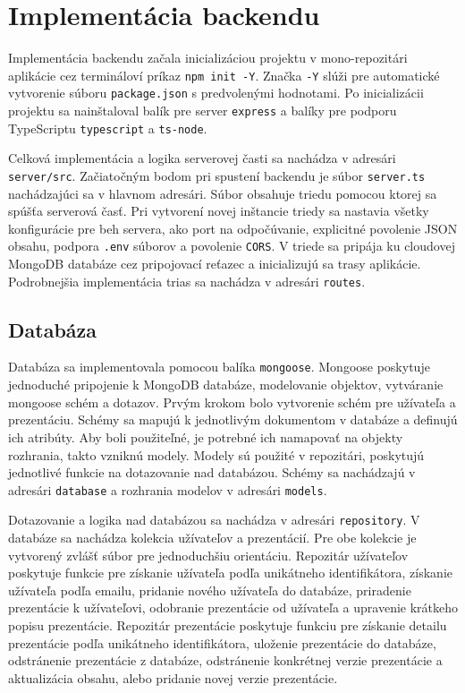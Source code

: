 \section{Implementácia backendu}
Implementácia backendu začala inicializáciou projektu v mono-repozitári aplikácie cez termináloví príkaz \texttt{npm init -Y}. Značka \texttt{-Y} slúži pre automatické vytvorenie súboru \texttt{package.json} s predvolenými hodnotami. Po inicializácii projektu sa nainštaloval balík pre server \texttt{express} a balíky pre podporu TypeScriptu \texttt{typescript} a \texttt{ts-node}.

Celková implementácia a logika serverovej časti sa nachádza v adresári \texttt{server/src}. Začiatočným bodom pri spustení backendu je súbor \texttt{server.ts} nachádzajúci sa v hlavnom adresári. Súbor obsahuje triedu pomocou ktorej sa spúšťa serverová časť. Pri vytvorení novej inštancie triedy sa nastavia všetky konfigurácie pre beh servera, ako port na odpočúvanie, explicitné povolenie JSON obsahu, podpora \texttt{.env} súborov a povolenie \texttt{CORS}. V triede sa pripája ku cloudovej MongoDB databáze cez pripojovací reťazec a inicializujú sa trasy aplikácie. Podrobnejšia implementácia trias sa nachádza v adresári \texttt{routes}. 

\subsection{Databáza}
Databáza sa implementovala pomocou balíka \texttt{mongoose}. Mongoose poskytuje jednoduché pripojenie k MongoDB databáze, modelovanie objektov, vytváranie mongoose schém a dotazov. Prvým krokom bolo vytvorenie schém pre užívateľa a prezentáciu. Schémy sa mapujú k jednotlivým dokumentom v databáze a definujú ich atribúty. Aby boli použiteľné, je potrebné ich namapovať na objekty rozhrania, takto vzniknú modely. Modely sú použité v repozitári, poskytujú jednotlivé funkcie na dotazovanie nad databázou. Schémy sa nachádzajú v adresári \texttt{database} a rozhrania modelov v adresári \texttt{models}.

Dotazovanie a logika nad databázou sa nachádza v adresári \texttt{repository}. V databáze sa nachádza kolekcia užívateľov a prezentácií. Pre obe kolekcie je vytvorený zvlášť súbor pre jednoduchšiu orientáciu. Repozitár užívateľov poskytuje funkcie pre získanie užívateľa podľa unikátneho identifikátora, získanie užívateľa podľa emailu, pridanie nového užívateľa do databáze, priradenie prezentácie k užívateľovi, odobranie prezentácie od užívateľa a upravenie krátkeho popisu prezentácie. Repozitár prezentácie poskytuje funkciu pre získanie detailu prezentácie podľa unikátneho identifikátora, uloženie prezentácie do databáze, odstránenie prezentácie z databáze, odstránenie konkrétnej verzie prezentácie a aktualizácia obsahu, alebo pridanie novej verzie prezentácie.

